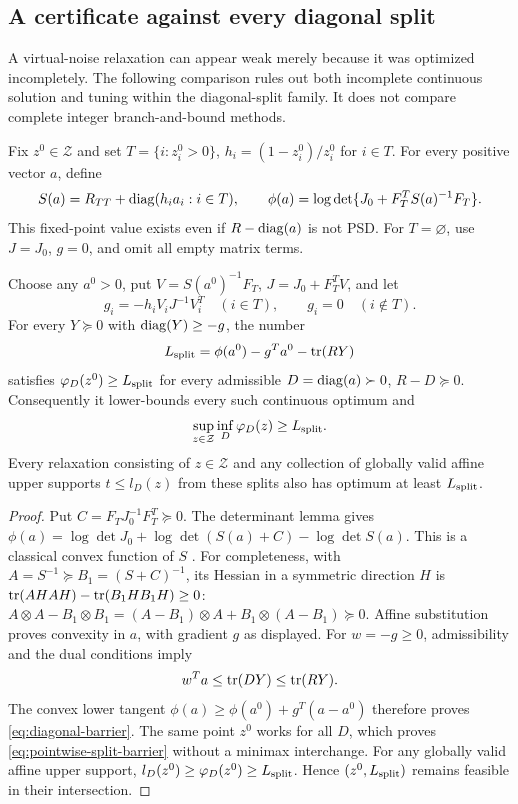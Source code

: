 \subsection{A certificate against every diagonal split}
\label{subsec:all-split}
A virtual-noise relaxation can appear weak merely because it was optimized
incompletely. The following comparison rules out both incomplete continuous
solution and tuning within the diagonal-split family. It does not compare
complete integer branch-and-bound methods.

Fix $z^0\in\mathcal Z$ and set $T=\{i:z_i^0>0\}$,
$h_i=(1-z_i^0)/z_i^0$ for $i\in T$. For every positive vector $a$, define
\[
 S(a)=R_{TT}+\operatorname{diag}(h_i a_i:i\in T),\qquad
 \phi(a)=\log\det\{J_0+F_T^T S(a)^{-1}F_T\}.
\]
This fixed-point value exists even if $R-\operatorname{diag}(a)$ is not PSD.
For $T=\varnothing$, use $J=J_0$, $g=0$, and omit all empty matrix terms.

\begin{proposition}\label{prop:diagonal-barrier}
Choose any $a^0>0$, put $V=S(a^0)^{-1}F_T$, $J=J_0+F_T^TV$,
and let
\[
 g_i=-h_i V_iJ^{-1}V_i^T\quad(i\in T),\qquad g_i=0\quad(i\notin T).
\]
For every $Y\succeq0$ with $\operatorname{diag}(Y)\ge-g$, the number
\begin{equation}\label{eq:diagonal-barrier}
 L_{\rm split}=\phi(a^0)-g^Ta^0-\operatorname{tr}(RY)
\end{equation}
satisfies $\varphi_D(z^0)\ge L_{\rm split}$ for every admissible
$D=\operatorname{diag}(a)\succ0$, $R-D\succeq0$. Consequently it lower-bounds every
such continuous optimum and
\begin{equation}\label{eq:pointwise-split-barrier}
 \sup_{z\in\mathcal Z}\inf_{D}\varphi_D(z)\ge L_{\rm split}.
\end{equation}
Every relaxation consisting of $z\in\mathcal Z$ and any collection of
globally valid affine upper supports $t\le l_D(z)$ from these splits also
has optimum at least $L_{\rm split}$.
\end{proposition}
\begin{proof}
Put $C=F_TJ_0^{-1}F_T^T\succeq0$. The determinant lemma gives
$\phi(a)=\log\det J_0+\log\det(S(a)+C)-\log\det S(a)$.
This is a classical convex function of $S$ \citep{KimKim2006,Kim2019}.
For completeness, with $A=S^{-1}\succeq B_1=(S+C)^{-1}$, its Hessian
in a symmetric direction $H$ is
$\operatorname{tr}(AHAH)-\operatorname{tr}(B_1HB_1H)\ge0$:
$A\otimes A-B_1\otimes B_1=(A-B_1)\otimes A+B_1\otimes(A-B_1)\succeq0$.
Affine substitution proves convexity in $a$, with gradient $g$ as displayed.
For $w=-g\ge0$, admissibility and the dual conditions imply
\[
 w^Ta\le\operatorname{tr}(DY)\le\operatorname{tr}(RY).
\]
The convex lower tangent $\phi(a)\ge\phi(a^0)+g^T(a-a^0)$ therefore
proves \eqref{eq:diagonal-barrier}. The same point $z^0$ works for all $D$,
which proves \eqref{eq:pointwise-split-barrier} without a minimax interchange.
For any globally valid affine upper support,
$l_D(z^0)\ge\varphi_D(z^0)\ge L_{\rm split}$. Hence $(z^0,L_{\rm split})$
remains feasible in their intersection.
\end{proof}

